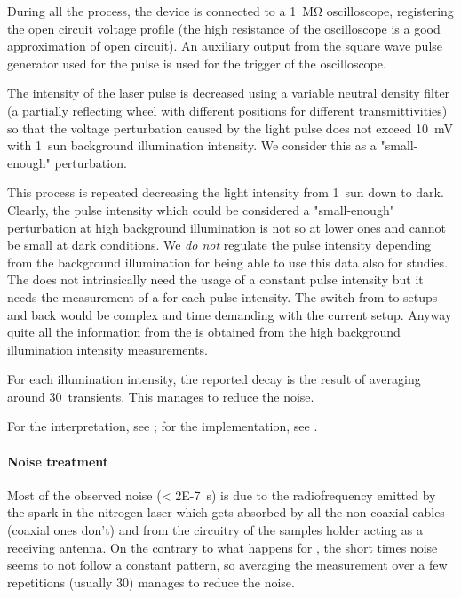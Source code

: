 	During all the process, the device is connected to a \SI{1}{\Mohm} oscilloscope, registering the open circuit voltage profile (the high resistance of the oscilloscope is a good approximation of open circuit). An auxiliary output from the square wave pulse generator used for the pulse is used for the trigger of the oscilloscope.

	The intensity of the laser pulse is decreased using a variable neutral density filter (a partially reflecting wheel with different positions for different transmittivities) so that the voltage perturbation caused by the light pulse does not exceed \SI{10}{\mV} with 1~sun background illumination intensity. We consider this as a "small-enough" perturbation.

	This process is repeated decreasing the light intensity from 1~sun down to dark. Clearly, the pulse intensity which could be considered a "small-enough" perturbation at high background illumination is not so at lower ones and cannot be small at dark conditions. We \emph{do not} regulate the pulse intensity depending from the background illumination for being able to use this data also for  studies. The  does not intrinsically need the usage of a constant pulse intensity but it needs the measurement of a  for each pulse intensity. The switch from  to  setups and back would be complex and time demanding with the current setup. Anyway quite all the information from the  is obtained from the high background illumination intensity measurements.

	For each illumination intensity, the reported decay is the result of averaging around 30~transients. This manages to reduce the noise.

	For the interpretation, see ; for the implementation, see .


	\paragraph{Noise treatment}\label{tpv_robust}

	Most of the observed noise (\SI{< 2E-7}{\s}) is due to the radiofrequency emitted by the spark in the nitrogen laser which gets absorbed by all the non-coaxial cables (coaxial ones don't) and from the circuitry of the samples holder acting as a receiving antenna. On the contrary to what happens for , the short times noise seems to not follow a constant pattern, so averaging the measurement over a few repetitions (usually 30) manages to reduce the noise.

